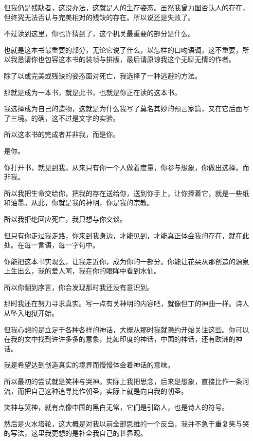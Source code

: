 \documentclass[UTF8]{article}
\begin{document}
\par 但我仍是残缺者，这没办法，这就是人的生存姿态。虽然我曾力图否认人的存在，但终究无法否认与完美相对的残缺的存在。所以说还是失败了。
\par 不过读到这里，你也许猜到了，这个机关最重要的部分是什么。
\par 也就是这本书最重要的部分，无论它说了什么，以怎样的口吻语调，这不重要，所以我恳请你也包容这本书的装帧与排版，最后请原谅我这个无聊无情的作者。
\\[0.6cm]
\par 除了以或完美或残缺的姿态面对死亡，我选择了一种逃避的方法。
\par 那就是成为一本书，就是此书，也就是你正在读的这本书。
\par 我选择成为自己的造物，这就是为什么我写了莫名其妙的预言家篇，又在它后面写了三境。的确，这不过是文字的实验。
\par 所以这本书的完成者并非我，而是你。
\par 是你。
\par 你打开书，就见到我。从来只有你一个人做着度量，你参与想象，你做出选择。而非我。
\par 所以我把生命交给你，把我的存在送给你，送到你手上，让你捧着它，就是一些纸和油墨。从此，你就是我的神明，你是我的宗教。
\\[0.6cm]
\par 所以我拒绝回应死亡，我只想与你交谈。
\par 但只有你走过我走路，你来到我身边，才能见到，才能真正体会我的存在，就在此处。在每一言语，每一字句中。
\par 你能把这本书实现么，让我走近你，成为你的一部分。你能让花朵从那创造的源泉上生出么，我的爱人呵，我在你的眼眸中看到水仙。
\\[0.6cm]
\par 所以你翻到序言，你会发现那时我还没有意识到。
\par 那时我还在努力寻求真实。写一点有关神明的内容吧，就像但丁的神曲一样。诗人从坠入地狱开始。
\par 但我心想的是立足于各种各样的神话，大概从那时我就隐约开始关注这些。你可以在我的文中找到许许多多的意象，比如印度的神话，中国的神话，还有欧洲的神话。
\par 我是希望达到创造真实的境界而慢慢体会着神话的意味。
\par 所以最初的尝试就是笑神与哭神。实际上我把思念，后来是想象，直接比作一条河流，而把自己这种追寻比作朝圣，实际上就是向自我的朝圣。
\par 笑神与哭神，就有点像中国的黑白无常，它们是引路人，也是诗人的符号。
\par 然后是火水塔轮，这大概是对我以前全部思维的一个反刍，我并不急于重复笑与哭的写法，这里我更想的是补全我自己的世界观。
\end{document}

